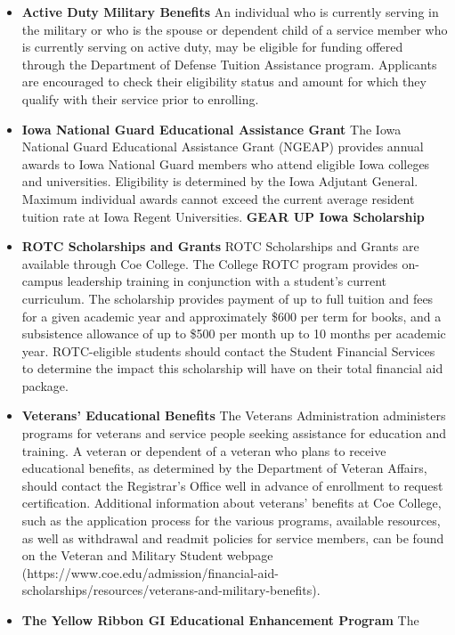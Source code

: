 \documentclass[
  letterpaper,
]{scrbook}
\begin{document}
\begin{itemize}
\item
  \textbf{Active Duty Military Benefits} An individual who is currently
  serving in the military or who is the spouse or dependent child of a
  service member who is currently serving on active duty, may be
  eligible for funding offered through the Department of Defense Tuition
  Assistance program. Applicants are encouraged to check their
  eligibility status and amount for which they qualify with their
  service prior to enrolling.
\item
  \textbf{Iowa National Guard Educational Assistance Grant} The Iowa
  National Guard Educational Assistance Grant (NGEAP) provides annual
  awards to Iowa National Guard members who attend eligible Iowa
  colleges and universities. Eligibility is determined by the Iowa
  Adjutant General. Maximum individual awards cannot exceed the current
  average resident tuition rate at Iowa Regent Universities.
  \textbf{GEAR UP Iowa Scholarship}
\item
  \textbf{ROTC Scholarships and Grants} ROTC Scholarships and Grants are
  available through Coe College. The College ROTC program provides
  on-campus leadership training in conjunction with a student's current
  curriculum. The scholarship provides payment of up to full tuition and
  fees for a given academic year and approximately \$600 per term for
  books, and a subsistence allowance of up to \$500 per month up to 10
  months per academic year. ROTC-eligible students should contact the
  Student Financial Services to determine the impact this scholarship
  will have on their total financial aid package.
\item
  \textbf{Veterans' Educational Benefits} The Veterans Administration
  administers programs for veterans and service people seeking
  assistance for education and training. A veteran or dependent of a
  veteran who plans to receive educational benefits, as determined by
  the Department of Veteran Affairs, should contact the Registrar's
  Office well in advance of enrollment to request certification.
  Additional information about veterans' benefits at Coe College, such
  as the application process for the various programs, available
  resources, as well as withdrawal and readmit policies for service
  members, can be found on the Veteran and Military Student webpage
  (https://www.coe.edu/admission/financial-aid-scholarships/resources/veterans-and-military-benefits).
\item
  \textbf{The Yellow Ribbon GI Educational Enhancement Program} The

\end{itemize}
\end{document}
